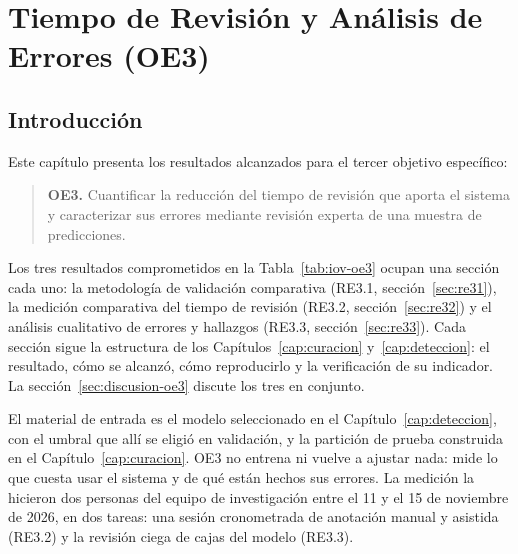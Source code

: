 \chapter{Tiempo de Revisión y Análisis de Errores (OE3)}
\label{cap:revision}

\newcommand{\figREV}{capitulos/06_oe3_revision/figures}

\section{Introducción}

Este capítulo presenta los resultados alcanzados para el tercer objetivo
específico:

\begin{quote}
    \textbf{OE3.} Cuantificar la reducción del tiempo de revisión que aporta el
    sistema y caracterizar sus errores mediante revisión experta de una muestra de
    predicciones.
\end{quote}

Los tres resultados comprometidos en la Tabla~\ref{tab:iov-oe3} ocupan una
sección cada uno: la metodología de validación comparativa (RE3.1,
sección~\ref{sec:re31}), la medición comparativa del tiempo de revisión (RE3.2,
sección~\ref{sec:re32}) y el análisis cualitativo de errores y hallazgos (RE3.3,
sección~\ref{sec:re33}). Cada sección sigue la estructura de los
Capítulos~\ref{cap:curacion} y~\ref{cap:deteccion}: el resultado, cómo se
alcanzó, cómo reproducirlo y la verificación de su indicador. La
sección~\ref{sec:discusion-oe3} discute los tres en conjunto.

El material de entrada es el modelo seleccionado en el
Capítulo~\ref{cap:deteccion}, con el umbral que allí se eligió en validación, y
la partición de prueba construida en el Capítulo~\ref{cap:curacion}. OE3 no
entrena ni vuelve a ajustar nada: mide lo que cuesta usar el sistema y de qué
están hechos sus errores. La medición la hicieron dos personas del equipo de
investigación entre el 11 y el 15 de noviembre de 2026, en dos tareas: una sesión
cronometrada de anotación manual y asistida (RE3.2) y la revisión ciega de
\uItems{} cajas del modelo (RE3.3).

